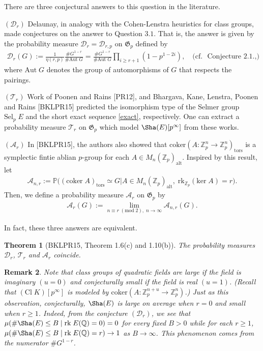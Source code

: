 \documentclass[12pt,reqno]{amsart}
\newtheorem{thm}{Theorem}[section]
\newtheorem{remark}[thm]{Remark}
\numberwithin{equation}{section}
\def\Z{{\mathbb Z}}
\def\Q{{\mathbb Q}}
\def\P{{\mathbb P}}
\def\sG{{\mathfrak G}}
\begin{document}
There are three conjectural answers to this question in the literature.

\smallskip

$(\mathscr{D}_r)$ Delaunay, in analogy with the Cohen-Lenstra heuristics for class groups, made conjectures on the answer to Question $3.1$. That is, the answer is given by the probability measure $\mathscr{D}_r = \mathscr{D}_{r,p}$ on $\sG_p$ defined by
\begin{align*}
\mathscr{D}_r(G):= \frac{1}{\eta(r,p)}\frac{\# G^{1-r}}{\# \text{Aut}\; G} = \frac{\# G^{1-r}}{\# \text{Aut}\; G}  \prod_{i \ge r+1} (1-p^{1-2i}), \quad \text{(cf.~ Conjecture $2.1$.,)}
\end{align*}
where $\text{Aut} \; G$ denotes the group of automorphisms of $G$ that respects the pairings.

\smallskip

$(\mathscr{T}_r)$ Work of Poonen and Rains [PR12], and Bhargava, Kane, Lenstra, Poonen and Rains [BKLPR15] predicted the isomorphism type of the Selmer group $\text{Sel}_p \; E$ and the short exact sequence \eqref{exact}, respectively. One can extract a probability measure $\mathscr{T}_r$ on $\sG_p$ which model $\Sha(E)[p^\infty]$ from these works.

\smallskip

$(\mathscr{A}_r)$ In [BKLPR15], the authors also showed that $\text{coker}(A: \Z_p^n \to \Z_p^n)_{\text{tors}}$ is a symplectic fintie ablian $p$-group for each $A \in M_n(\Z_p)_{\text{alt}}$. Inspired by this result, let 
\begin{align*}
\mathscr{A}_{n,r}:= \P\big( (\text{coker} \; A)_{\text{tors}} \simeq G | A \in M_n(\Z_p)_{\text{alt}}, \; \text{rk}_{\Z_p}(\text{ker} \; A) = r \big).
\end{align*}
Then, we define a probability measure $\mathscr{A}_r$ on $\sG_p$ by
\begin{align*}
\mathscr{A}_r(G):= \lim_{n \equiv r \; (\text{mod} \; 2), \; n \to \infty} \mathscr{A}_{n,r}(G).
\end{align*}

\smallskip

In fact, these three answers are equivalent.

\begin{thm}[BKLPR15, Theorem 1.6(c) and 1.10(b)] \label{t:reason}
The probability measures $\mathscr{D}_r$, $\mathscr{T}_r$ and $\mathscr{A}_r$ coincide.
\end{thm}

\begin{remark}
{\rm
Note that class groups of quadratic fields are large if the field is imaginary $(u=0)$ and conjecturally small if the field is real $(u=1)$. (Recall that $(\text{Cl} \; K)[p^\infty]$ is modeled by $\text{coker}(A : \Z_p^{n+u} \to \Z_p^n)$.) Just as this observation, conjecturally, $\Sha(E)$ is large on average when $r = 0$ and small when $r \ge 1$.
Indeed, from the conjecture $(\mathscr{D}_r)$, we see that $\mu(\# \Sha(E) \le B \; | \; \text{rk} \; E(\Q) = 0) = 0$ for every fixed $B>0$ while for each $r \ge 1$, $\mu(\# \Sha(E) \le B \; | \; \text{rk} \; E(\Q) = r) \to 1$ as $B \to \infty$. This phenomenon comes from the numerator $\# G^{1-r}$.
}
\end{remark}
\end{document}
